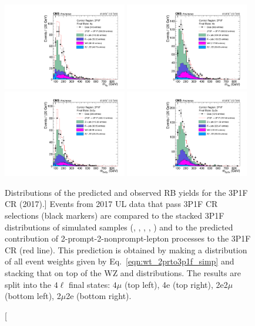 \begin{figure}[!htbp]
	\begin{center}
		\includegraphics[width=0.48\textwidth]{figures/higgsmassmeas/redbkg/cr/UL2017_CR_3P1F_4mu.pdf}
		\includegraphics[width=0.48\textwidth]{figures/higgsmassmeas/redbkg/cr/UL2017_CR_3P1F_4e.pdf}
		\includegraphics[width=0.48\textwidth]{figures/higgsmassmeas/redbkg/cr/UL2017_CR_3P1F_2e2mu.pdf}
		\includegraphics[width=0.48\textwidth]{figures/higgsmassmeas/redbkg/cr/UL2017_CR_3P1F_2mu2e.pdf}
		\caption
			[Distributions of the predicted and observed RB yields for the 3P1F CR (2017).]
			{
			Events from 2017 UL data that pass 3P1F CR selections (black markers) 
			are compared to the stacked 3P1F distributions of simulated samples
			(\Zplusjets, \ttbarplusjets, \WZ, \ZZ, \Zgammastar)
			and to the predicted contribution of 2-prompt-2-nonprompt-lepton processes to the 3P1F CR (red line).
			This prediction is obtained by making a distribution of all event weights given by Eq.~\ref{eqn:wt_2prto3p1f_simp} and stacking that on top of the WZ and \ZZ distributions.
			The results are split into the $4\ell$ final states:
			$4\mu$ (top left), 4e (top right), 2e2$\mu$ (bottom left), 2$\mu$2e (bottom right).
			}
		\label{cr_plots_3p1f_2017}
	\end{center}
\end{figure}

